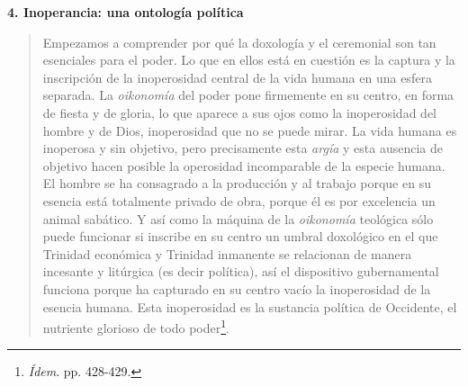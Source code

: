 \documentclass{book}
\begin{document}
\textbf{4. Inoperancia: una ontología política}

\begin{quote}
Empezamos a comprender por qué la doxología y el ceremonial son tan
esenciales para el poder. Lo que en ellos está en cuestión es la captura
y la inscripción de la inoperosidad central de la vida humana en una
esfera separada. La \emph{oikonomía} del poder pone firmemente en su
centro, en forma de fiesta y de gloria, lo que aparece a sus ojos como
la inoperosidad del hombre y de Dios, inoperosidad que no se puede
mirar. La vida humana es inoperosa y sin objetivo, pero precisamente
esta \emph{argía} y esta ausencia de objetivo hacen posible la
operosidad incomparable de la especie humana. El hombre se ha consagrado
a la producción y al trabajo porque en su esencia está totalmente
privado de obra, porque él es por excelencia un animal sabático. Y así
como la máquina de la \emph{oikonomía} teológica sólo puede funcionar si
inscribe en su centro un umbral doxológico en el que Trinidad económica
y Trinidad inmanente se relacionan de manera incesante y litúrgica (es
decir política), así el dispositivo gubernamental funciona porque ha
capturado en su centro vacío la inoperosidad de la esencia humana. Esta
inoperosidad es la sustancia política de Occidente, el nutriente
glorioso de todo poder\footnote{\emph{Ídem}. pp. 428-429.}.
\end{quote}
\end{document}
